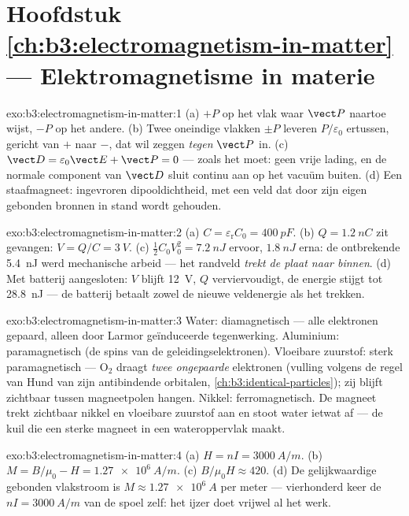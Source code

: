 \section*{Hoofdstuk \ref{ch:b3:electromagnetism-in-matter} --- Elektromagnetisme in materie}

\begin{solution}{exo:b3:electromagnetism-in-matter:1}
(a) $+P$ op het vlak waar $\vect P$ naartoe wijst, $-P$ op het andere. (b)
Twee oneindige vlakken $\pm P$ leveren $P/\varepsilon_0$ ertussen,
gericht van $+$ naar $-$, dat wil zeggen \emph{tegen} $\vect P$ in. (c)
$\vect D = \varepsilon_0\vect E + \vect P = 0$ --- zoals het moet:
geen vrije lading, en de normale component van $\vect D$ sluit continu aan op
het vacuüm buiten. (d) Een staafmagneet: ingevroren dipooldichtheid,
met een veld dat door zijn eigen gebonden bronnen in stand wordt gehouden.
\end{solution}

\begin{solution}{exo:b3:electromagnetism-in-matter:2}
(a) $C = \varepsilon_{\text{r}}C_0 = \qty{400}{pF}$. (b) $Q =
\qty{1.2}{nC}$ zit gevangen: $V = Q/C = \qty{3}{V}$. (c)
$\tfrac12C_0V_0^2 = \qty{7.2}{nJ}$ ervoor, $\qty{1.8}{nJ}$ erna:
de ontbrekende \qty{5.4}{nJ} werd mechanische arbeid --- het randveld
\emph{trekt de plaat naar binnen}. (d) Met batterij aangesloten: $V$ blijft
\qty{12}{V}, $Q$ verviervoudigt, de energie stijgt tot \qty{28.8}{nJ} ---
de batterij betaalt zowel de nieuwe veldenergie als het trekken.
\end{solution}

\begin{solution}{exo:b3:electromagnetism-in-matter:3}
Water: diamagnetisch --- alle elektronen gepaard, alleen door Larmor
geïnduceerde tegenwerking. Aluminium: paramagnetisch (de spins van de geleidingselektronen).
Vloeibare zuurstof: sterk paramagnetisch --- O$_2$ draagt \emph{twee
ongepaarde} elektronen (vulling volgens de regel van Hund van zijn antibindende
orbitalen, \cref{ch:b3:identical-particles}); zij blijft zichtbaar
tussen magneetpolen hangen. Nikkel: ferromagnetisch. De magneet trekt zichtbaar
nikkel en vloeibare zuurstof aan en stoot water ietwat af
--- de kuil die een sterke magneet in een wateroppervlak maakt.
\end{solution}

\begin{solution}{exo:b3:electromagnetism-in-matter:4}
(a) $H = nI = \qty{3000}{A/m}$. (b) $M = B/\mu_0 - H =
\qty{1.27e6}{A/m}$. (c) $B/\mu_0H \approx 420$. (d) De
gelijkwaardige gebonden vlakstroom is $M \approx \qty{1.27e6}{A}$ per
meter --- vierhonderd keer de $nI = \qty{3000}{A/m}$ van de spoel zelf:
het ijzer doet vrijwel al het werk.
\end{solution}

